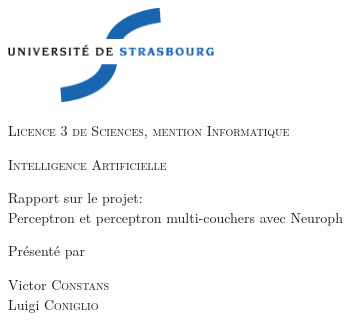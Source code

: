 \thispagestyle{empty}

\begin{center}
       \noindent
       \includegraphics[height=2.5cm]{./pics/uds.eps}       
       
       \vfill\vfill

    {\large \textsc{Licence 3 de Sciences, mention Informatique}}

    \bigskip\bigskip

    {\large \textsc{Intelligence Artificielle}}

    \vfill\vfill

    {\huge \sc
      \begin{center} 
        Rapport sur le projet: \\
        Perceptron et perceptron multi-couchers avec Neuroph
      \end{center}}

    \vfill\vfill

    {\large Présenté par}

\medskip

    {\large Victor \textsc{Constans}}\\
    {\large Luigi  \textsc{Coniglio}}\\
\bigskip

\end{center}
